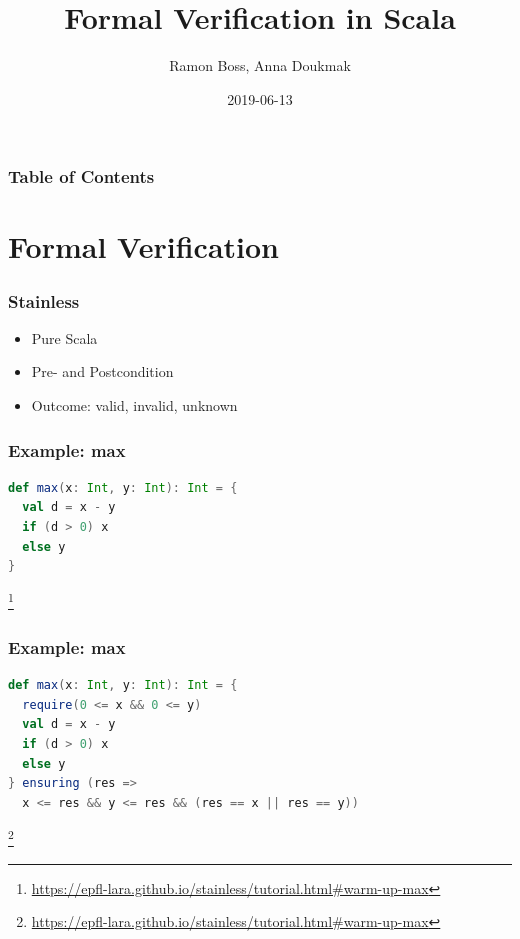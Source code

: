 \documentclass{beamer}
\newcommand\blfootnote[1]{%
  \begingroup
  \renewcommand\thefootnote{}\footnote{#1}%
  \addtocounter{footnote}{-1}%
  \endgroup
}
\begin{document}
\title{Formal Verification in Scala}
\author{Ramon Boss, Anna Doukmak}

\date{2019-06-13}

\frame{\titlepage}

\begin{frame}
  \frametitle{Table of Contents}
  \tableofcontents
\end{frame}

\section{Formal Verification}


\begin{frame}
\frametitle{Stainless}
\begin{itemize}
  \item Pure Scala
  \item Pre- and Postcondition
  \item Outcome: valid, invalid, unknown
\end{itemize}
\end{frame}


\begin{frame}[fragile]
\frametitle{Example: max}
\begin{lstlisting}[language=Scala]
def max(x: Int, y: Int): Int = {
  val d = x - y
  if (d > 0) x
  else y
}
\end{lstlisting}
\blfootnote{\url{https://epfl-lara.github.io/stainless/tutorial.html\#warm-up-max}}
\end{frame}


\begin{frame}[fragile]
\frametitle{Example: max}
\begin{lstlisting}[language=Scala]
def max(x: Int, y: Int): Int = {
  require(0 <= x && 0 <= y)
  val d = x - y
  if (d > 0) x
  else y
} ensuring (res =>
  x <= res && y <= res && (res == x || res == y))
\end{lstlisting}
\blfootnote{\url{https://epfl-lara.github.io/stainless/tutorial.html\#warm-up-max}}
\end{frame}
\end{document}
